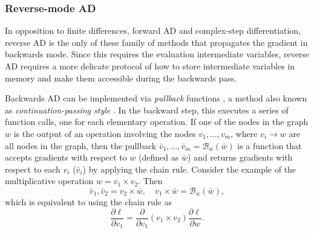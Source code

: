 \subsubsection{Reverse-mode AD}

In opposition to finite differences, forward AD and complex-step differentiation, reverse AD is the only of these family of methods that propagates the gradient in backwards mode. 
Since this requires the evaluation intermediate variables, reverse AD requires a more delicate protocol of how to store intermediate variables in memory and make them accessible during the backwards pass. 

Backwards AD can be implemented via \textit{pullback} functions \cite{Innes_2018}, a method also known as \textit{continuation-passing style} \cite{Wang_Zheng_Decker_Wu_Essertel_Rompf_2019}.
In the backward step, this executes a series of function calls, one for each elementary operation.
If one of the nodes in the graph $w$ is the output of an operation involving the nodes $v_1, \ldots, v_m$, where $v_i \rightarrow w$ are all nodes in the graph, then the pullback $\bar v_1, \ldots, \bar v_m = \mathcal B_w(\bar w)$ is a function that accepts gradients with respect to $w$ (defined as $\bar w$) and returns gradients with respect to each $v_i$ ($\bar v_i$) by applying the chain rule. 
Consider the example of the multiplicative operation $w = v_1 \times v_2$. Then
\begin{equation}
 \bar v_1, \bar v_2 = v_2 \times \bar w , \quad
 v_1 \times \bar w = \mathcal{B}_w (\bar w),
\end{equation}
which is equivalent to using the chain rule as
\begin{equation}
 \frac{\partial \ell}{\partial v_1} = \frac{\partial}{\partial v_1}(v_1 \times v_2) \frac{\partial \ell}{\partial w}.
\end{equation}



